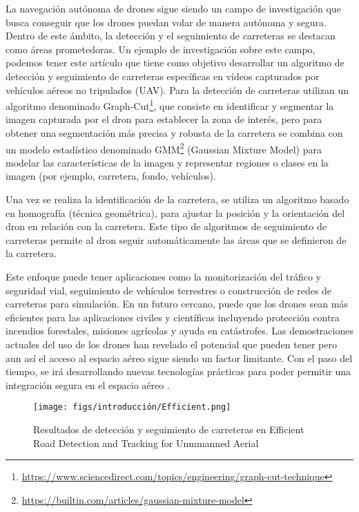 La navegación autónoma de drones sigue siendo un campo de investigación que busca conseguir que los drones puedan volar de manera autónoma y segura.
Dentro de este ámbito, la detección y el seguimiento de carreteras se destacan como áreas prometedoras. Un ejemplo de investigación sobre este campo, podemos 
tener este artículo \cite{article} que tiene como objetivo desarrollar un algoritmo de detección 
y seguimiento de carreteras específicas en vídeos capturados por vehículos aéreos no tripulados (UAV). Para la detección de carreteras utilizan 
un algoritmo denominado Graph-Cut\footnote{\url{https://www.sciencedirect.com/topics/engineering/graph-cut-technique}}, 
que consiste en identificar y segmentar la imagen capturada por el dron para establecer la zona de interés, pero para obtener una segmentación más precisa y robusta de la carretera 
se combina con un modelo estadístico denominado GMM\footnote{\url{https://builtin.com/articles/gaussian-mixture-model}} (Gaussian Mixture Model) para modelar las características de la imagen y 
representar regiones o clases
en la imagen (por ejemplo, carretera, fondo, vehículos).

Una vez se realiza la identificación de la carretera, se utiliza un algoritmo basado en homografía (técnica geométrica), para ajustar la posición y la orientación del dron
en relación con la carretera. Este tipo de algoritmos de seguimiento de carreteras permite al dron seguir automáticamente las áreas que se definieron de la carretera. 

Este enfoque puede tener aplicaciones como la monitorización del tráfico y seguridad vial, seguimiento de vehículos terrestres o construcción de redes de carreteras para simulación. 
En un futuro cercano, puede que los drones sean más eficientes para las aplicaciones civiles y científicas incluyendo protección contra incendios forestales, misiones agrícolas y 
ayuda en catástrofes. 
Las demostraciones actuales del uso de los drones han revelado el potencial que pueden tener pero aun así el acceso al espacio aéreo sigue siendo un factor limitante. Con el paso del 
tiempo, se irá desarrollando nuevas tecnologías prácticas para poder permitir una integración segura en el espacio aéreo \cite{KrejciGarzon_2014}. 

\begin{figure} [H]
  \begin{center}
    \texttt{[image: figs/introducción/Efficient.png]}
  \end{center}
  \caption{Resultados de detección y seguimiento de carreteras en Efficient Road Detection and Tracking for Unmmanned Aerial \cite{article}}
  \label{fig:Efficient}
  \vspace{-1.5em}
\end{figure}

